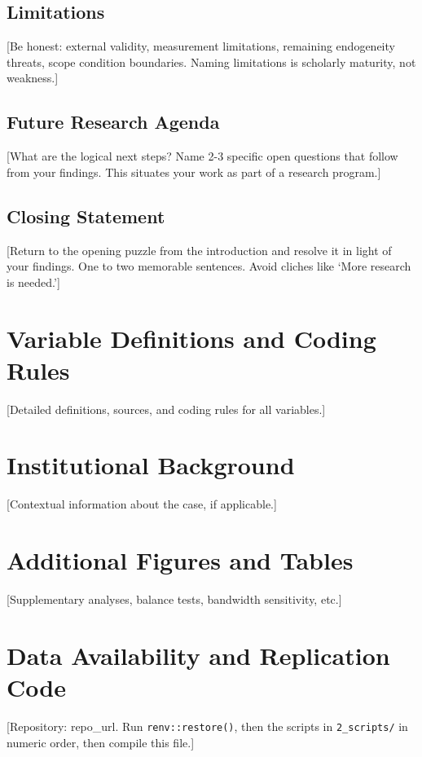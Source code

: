 \subsection{Limitations} %
[Be honest: external validity, measurement limitations, remaining endogeneity threats, scope condition boundaries. Naming limitations is scholarly maturity, not weakness.]

\subsection{Future Research Agenda} %
[What are the logical next steps? Name 2-3 specific open questions that follow from your findings. This situates your work as part of a research program.]

\subsection{Closing Statement} %
[Return to the opening puzzle from the introduction and resolve it in light of your findings. One to two memorable sentences. Avoid cliches like `More research is needed.']

\newpage
\printbibliography

\newpage
\appendix
\section{Variable Definitions and Coding Rules}\label{app:variables}
[Detailed definitions, sources, and coding rules for all variables.]

\section{Institutional Background}\label{app:background}
[Contextual information about the case, if applicable.]

\section{Additional Figures and Tables}\label{app:additional}
[Supplementary analyses, balance tests, bandwidth sensitivity, etc.]

\section{Data Availability and Replication Code}\label{app:replication}
[Repository: {{repo_url}}. Run \texttt{renv::restore()}, then the scripts in \texttt{2\_scripts/} in numeric order, then compile this file.]


